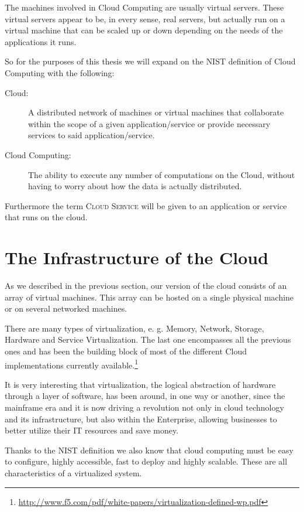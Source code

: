 The machines involved in Cloud Computing are usually virtual servers. These virtual servers appear to be, in every sense, real servers, but actually run on a virtual machine that can be scaled up or down depending on the needs of the applications it runs.

So for the purposes of this thesis we will expand on the \ac{NIST} definition of Cloud Computing with the following:
\begin{description}
\item[Cloud:] A distributed network of machines or virtual machines that collaborate within the scope of a given application/service or provide necessary services to said application/service.  
\item[Cloud Computing:] The ability to execute any number of computations on the Cloud, without having to worry about how the data is actually distributed.
\end{description}

Furthermore the term \textsc{Cloud Service} will be given to an application or service that runs on the cloud.

\section{The Infrastructure of the Cloud}

As we described in the previous section, our version of the cloud consists of an array of virtual machines. This array can be hosted on a single physical machine or on several networked machines.

There are many types of virtualization, e. g. Memory, Network, Storage, Hardware and Service Virtualization. The last one encompasses all the previous ones and has been the building block of most of the different Cloud implementations currently available.\footnote{\url{http://www.f5.com/pdf/white-papers/virtualization-defined-wp.pdf}}

It is very interesting that virtualization, the logical abstraction of hardware through a layer of software, has been around, in one way or another, since the mainframe era\cite[p. 3]{williams:2012} and it is now driving a revolution not only in cloud technology and its infrastructure, but also within the Enterprise, allowing businesses to better utilize their IT resources and save money.   

Thanks to the \ac{NIST} definition we also know that cloud computing must be easy to configure, highly accessible, fast to deploy and highly scalable. These are all characteristics of a virtualized system.
\cite{vmware:2007}

